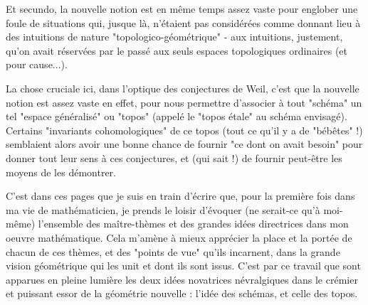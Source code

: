 Et secundo, la nouvelle notion est en même temps assez vaste pour englober une foule de situations qui, jusque là, n'étaient pas considérées comme donnant lieu à des intuitions de nature "topologico-géométrique" - aux intuitions, justement, qu'on avait réservées par le passé aux seuls espaces topologiques ordinaires (et pour cause...).

La chose cruciale ici, dans l'optique des conjectures de Weil, c'est que la nouvelle notion est assez vaste en effet, pour nous permettre d'associer à tout "schéma" un tel "espace généralisé" ou "topos" (appelé le "topos étale" au schéma envisagé). Certains "invariants cohomologiques" de ce topos (tout ce qu'il y a de "bébêtes" !) semblaient alors avoir une bonne chance de fournir "ce dont on avait besoin" pour donner tout leur sens à ces conjectures, et (qui sait !) de fournir peut-être les moyens de les démontrer.

C'est dans ces pages que je suis en train d'écrire que, pour la première fois dans ma vie de mathématicien, je prends le loisir d'évoquer (ne serait-ce qu'à moi-même) l'ensemble des maître-thèmes et des grandes idées directrices dans mon oeuvre mathématique. Cela m'amène à mieux apprécier la place et la portée de chacun de ces thèmes, et des "points de vue" qu'ils incarnent, dans la grande vision géométrique qui les unit et dont ils sont issus. C'est par ce travail que sont apparues en pleine lumière les deux idées novatrices névralgiques dans le crémier et puissant essor de la géométrie nouvelle : l'idée des schémas, et celle des topos.

